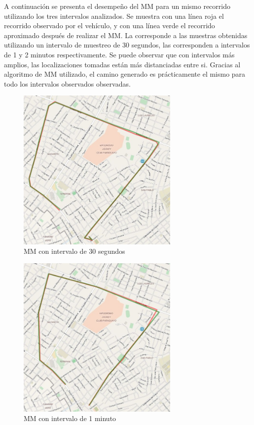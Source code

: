 A continuación se presenta el desempeño del MM para un mismo recorrido utilizando los tres intervalos analizados. Se muestra con una línea roja el recorrido observado por el vehículo, y con una línea verde el recorrido aproximado después de realizar el MM. La  corresponde a las muestras obtenidas utilizando un intervalo de muestreo de 30 segundos, las  corresponden a intervalos de 1 y 2 minutos respectivamente. Se puede observar que con intervalos más amplios, las localizaciones tomadas están más distanciadas entre si. Gracias al algoritmo de MM utilizado, el camino generado es prácticamente el mismo para todo los intervalos observados observadas.

\begin{figure}[!htb]
	\centering
	\includegraphics[width=0.7\textwidth]{capitulos/7/figuras/figura1.jpg}
	\caption{\label{fig:mm_30s} MM con intervalo de 30 segundos}	
\end{figure}

\begin{figure}[!htb]
	\centering
	\includegraphics[width=0.7\textwidth]{capitulos/7/figuras/figura2.jpg}
	\caption{\label{fig:mm_1m} MM con intervalo de 1 minuto}	
\end{figure}


